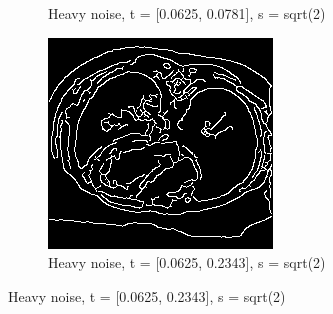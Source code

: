 \begin{figure}[H]
\begin{subfigure}{.5\textwidth}
    \caption{Heavy noise, t = [0.0625, 0.0781], s = sqrt(2)}
    \label{fig:h_noise_sens_h_thres}
  \end{subfigure}%
  \begin{subfigure}{.5\textwidth}
    \centering
    \includegraphics[width=.9\textwidth]{./edgedetection/canny_heavy_noise/h_noise_insens_h_thres}
    \caption{Heavy noise, t = [0.0625, 0.2343], s = sqrt(2)}
    \label{fig:h_noise_insens_h_thres}
  \end{subfigure}%
  
\end{figure}

